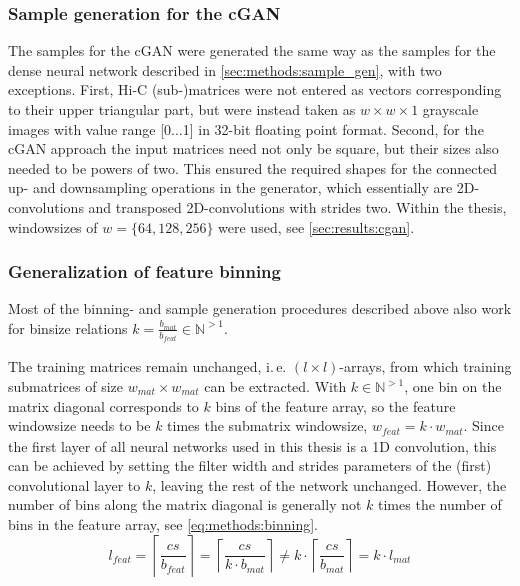 \subsubsection{Sample generation for the cGAN} \label{sec:methods:sample_gen_cgan}
The samples for the cGAN were generated the same way as the samples for the dense neural network described 
in \cref{sec:methods:sample_gen}, with two exceptions.
First, Hi-C (sub-)matrices were not entered as vectors corresponding to their upper triangular part, 
but were instead taken as $w\times w \times 1$ grayscale images with value range [0...1] in 32-bit floating point format.
Second, for the cGAN approach the input matrices need not only be square,
but their sizes also needed to be powers of two. 
This ensured the required shapes for the connected up- and downsampling operations in the generator, 
which essentially are 2D-convolutions and transposed 2D-convolutions with strides two.
Within the thesis, windowsizes of $w=\{64,128,256\}$ were used, see \cref{sec:results:cgan}.

\subsubsection{Generalization of feature binning} \label{sec:methods:inputBinning}
Most of the binning- and sample generation procedures described above 
also work for binsize relations $k=\frac{b_\mathit{mat}}{b_\mathit{feat}} \in \mathbb{N}^{>1}$.

The training matrices remain unchanged, i.\,e. $(l \times l)$-arrays, from which training submatrices of size  $w_\mathit{mat} \times w_\mathit{mat} $
can be extracted. 
With $k \in \mathbb{N}^{>1}$, one bin on the matrix diagonal corresponds to $k$ bins of the feature array,
so the feature windowsize needs to be $k$ times the submatrix windowsize, $w_\mathit{feat} = k \cdot w_\mathit{mat}$.
Since the first layer of all neural networks used in this thesis is a 1D convolution,
this can be achieved by setting the filter width and strides parameters of the (first) convolutional layer to $k$, leaving the rest of the network unchanged.
However, the number of bins along the matrix diagonal is generally not $k$ times the number of bins in the feature array,
see \cref{eq:methods:binning}.
\begin{equation}
 l_\mathit{feat} = \left \lceil{\frac{cs}{b_\mathit{feat}}}\right \rceil
                = \left \lceil{\frac{cs}{k \cdot b_\mathit{mat}}}\right \rceil 
                \not = k \cdot \left \lceil{\frac{cs}{ b_\mathit{mat}}}\right \rceil
                = k \cdot l_\mathit{mat} \label{eq:methods:binning}
\end{equation}

